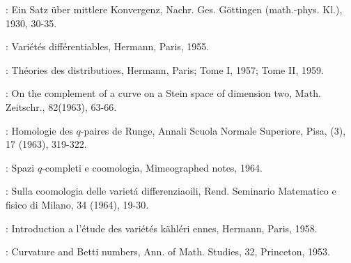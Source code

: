 \begin{thebibliography}{99}
: Ein Satz \"uber mittlere
  Konvergenz, Nachr. Ges. G\"ottingen (math.-phys. Kl.), 1930,
  30-35.  

: Vari\'et\'es
  diff\'erentiables, Hermann,  Paris, 1955.

:  Th\'eories des distributioes,
  Hermann, Paris; Tome I, 1957; Tome II, 1959.

:  On the complement of a curve on a Stein
  space of dimension two, Math. Zeitschr., 82(1963), 63-66.

: Homologie des $q$-paires de Runge, Annali
  Scuola Normale Superiore, Pisa, (3), 17 (1963), 319-322.

: Spazi $q$-completi e
  coomologia, Mimeographed notes, 1964.

: Sulla coomologia delle variet\'a
  differenziaoili, Rend. Seminario Matematico e fisico di Milano,
  34 (1964), 19-30.

: Introduction a l'\'etude des
  vari\'et\'es k\"ahl\'eri ennes,  Hermann, Paris, 1958. 

: Curvature and Betti numbers,
  Ann. of Math. Studies, 32, Princeton, 1953.
\end{thebibliography}

